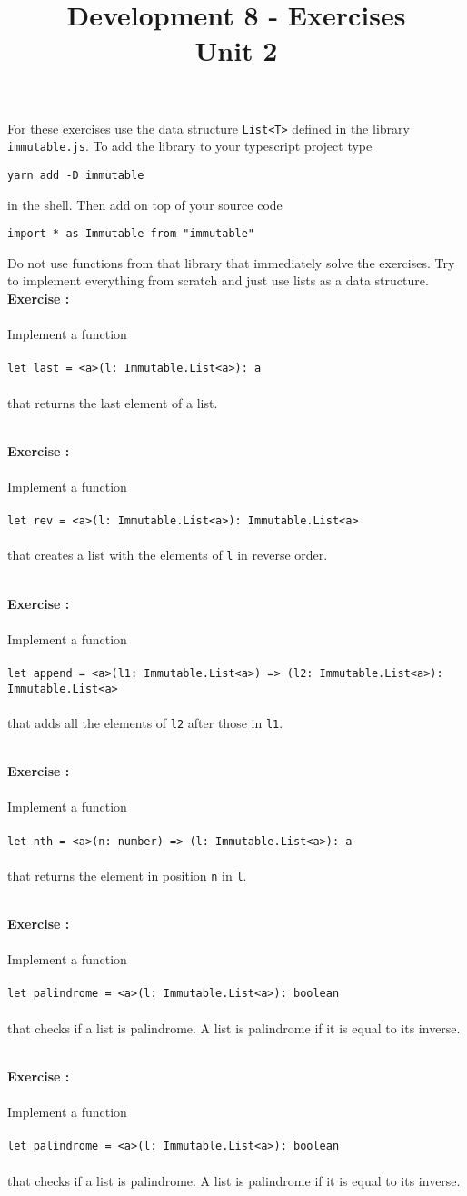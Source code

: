 \documentclass[]{article}
\title{Development 8 - Exercises\\Unit 2}
\author{}
\date{}
\newcounter{ExerciseCount}
\newcommand{\functionEx}[3]{
  Implement a function\\\\
   \texttt{let #1 = #2}\\\\ #3
}
\newcommand{\exercise}[1]{\noindent \textbf{Exercise \theExerciseCount:}\\\\ #1 \addtocounter{ExerciseCount}{1}
}
\begin{document}
\maketitle

\noindent
For these exercises use the data structure \texttt{List<T>} defined in the library \texttt{immutable.js}. To add the library to your typescript project type

\begin{lstlisting}
yarn add -D immutable
\end{lstlisting}

\noindent
in the shell. Then add on top of your source code

\begin{lstlisting}
import * as Immutable from "immutable"
\end{lstlisting}

\noindent
Do not use functions from that library that immediately solve the exercises. Try to implement everything from scratch and just use lists as a data structure.\\

\exercise{
  \functionEx{last}{<a>(l: Immutable.List<a>): a}{
    that returns the last element of a list.
  }
}\\

\exercise{
  \functionEx{rev}{<a>(l: Immutable.List<a>): Immutable.List<a>}{
    that creates a list with the elements of \texttt{l} in reverse order.
  }
}\\

\exercise{
  \functionEx{append}{<a>(l1: Immutable.List<a>) => (l2: Immutable.List<a>):\\  Immutable.List<a>}{
    that adds all the elements of \texttt{l2} after those in \texttt{l1}.
  }
}\\

\exercise{
  \functionEx{nth}{<a>(n: number) => (l: Immutable.List<a>): a}{
    that returns the element in position \texttt{n} in \texttt{l}.
  }
}\\

\exercise{
  \functionEx{palindrome}{<a>(l: Immutable.List<a>): boolean}{
    that checks if a list is palindrome. A list is palindrome if it is equal to its inverse.
  }
}\\

\exercise{
  \functionEx{palindrome}{<a>(l: Immutable.List<a>): boolean}{
    that checks if a list is palindrome. A list is palindrome if it is equal to its inverse.
  }
}\\
\end{document}
